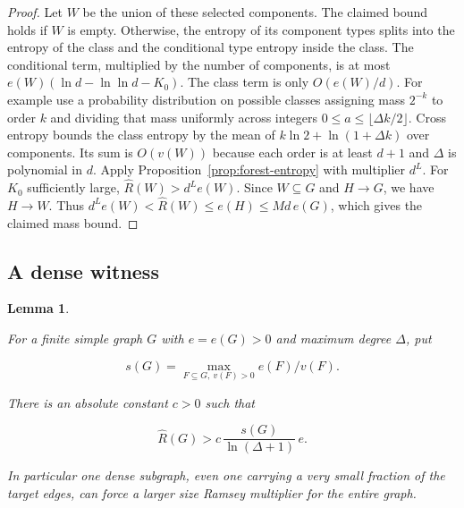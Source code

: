 \documentclass[11pt]{amsart}
\newtheorem{lemma}[theorem]{Lemma}
\theoremstyle{definition}
\theoremstyle{remark}
\numberwithin{equation}{section}
\begin{document}
\begin{proof}

Let $W$ be the union of these selected components. The claimed bound holds if $W$ is empty. Otherwise, the entropy of its component types splits into the entropy of the class and the conditional type entropy inside the class. The conditional term, multiplied by the number of components, is at most $e(W)(\ln d-\ln\ln d-K_0)$. The class term is only $ O(e(W)/d)$. For example use a probability distribution on possible classes assigning mass $2^{-k}$ to order $ k $ and dividing that mass uniformly across integers $0\le a\le \lfloor\Delta k/2\rfloor $. Cross entropy bounds the class entropy by the mean of $ k\ln2+\ln(1+\Delta k)$ over components. Its sum is $ O(v(W))$ because each order is at least $ d+1$ and $\Delta $ is polynomial in $ d $. Apply Proposition~\ref{prop:forest-entropy} with multiplier $ d^L $. For $K_0$ sufficiently large, $\widehat R(W)>d^Le(W)$. Since $W\subseteq G$ and $H\to G$, we have $H\to W$. Thus $d^Le(W)<\widehat R(W)\le e(H)\le Md\,e(G)$, which gives the claimed mass bound.

\end{proof}

\subsection{A dense witness}

\begin{lemma}\label{lem:dense-witness}

For a finite simple graph $G$ with $ e=e(G)>0$ and maximum degree $\Delta$, put

\begin{equation}
s(G)=\max_{F\subseteq G,\ v(F)>0} e(F)/v(F).
\end{equation}

There is an absolute constant $c>0$ such that

\begin{equation}
\widehat R(G)>c\,\frac{s(G)}{\ln(\Delta+1)}\,e.
\end{equation}

In particular one dense subgraph, even one carrying a very small fraction of the target edges, can force a larger size Ramsey multiplier for the entire graph.

\end{lemma}
\end{document}

